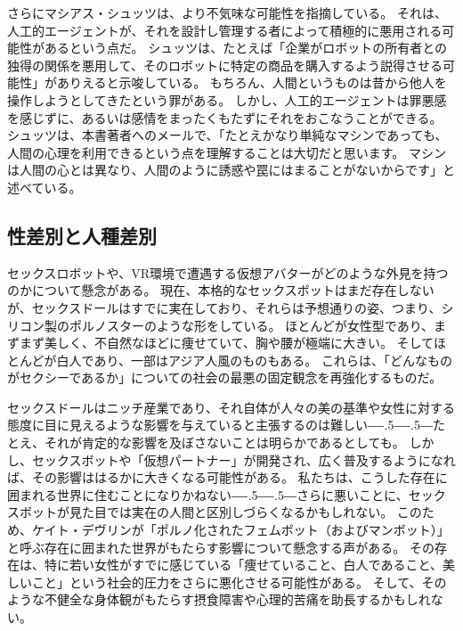 \documentclass[paper=a4,book,openany]{jlreq}
\def\DDASH{―\kern-.5\zw―\kern-.5\zw―} %
\begin{document}
さらにマシアス・シュッツは、より不気味な可能性を指摘している。
それは、人工的エージェントが、それを設計し管理する者によって積極的に悪用される可能性があるという点だ。
シュッツは、たとえば「企業がロボットの所有者との独得の関係を悪用して、そのロボットに特定の商品を購入するよう説得させる可能性」がありえると示唆している。
もちろん、人間というものは昔から他人を操作しようとしてきたという罪がある。
しかし、人工的エージェントは罪悪感を感じずに、あるいは感情をまったくもたずにそれをおこなうことができる。
シュッツは、本書著者へのメールで、「たとえかなり単純なマシンであっても、人間の心理を利用できるという点を理解することは大切だと思います。
マシンは人間の心とは異なり、人間のように誘惑や罠にはまることがないからです」と述べている。

\subsection{性差別と人種差別}

セックスロボットや、VR環境で遭遇する仮想アバターがどのような外見を持つのかについて懸念がある。
現在、本格的なセックスボットはまだ存在しないが、セックスドールはすでに実在しており、それらは予想通りの姿、つまり、シリコン製のポルノスターのような形をしている。
ほとんどが女性型であり、まずまず美しく、不自然なほどに痩せていて、胸や腰が極端に大きい。
そしてほとんどが白人であり、一部はアジア人風のものもある。
これらは、「どんなものがセクシーであるか」についての社会の最悪の固定観念を再強化するものだ。

セックスドールはニッチ産業であり、それ自体が人々の美の基準や女性に対する態度に目に見えるような影響を与えていると主張するのは難しい{\DDASH}たとえ、それが肯定的な影響を及ぼさないことは明らかであるとしても。
しかし、セックスボットや「仮想パートナー」が開発され、広く普及するようになれば、その影響ははるかに大きくなる可能性がある。
私たちは、こうした存在に囲まれる世界に住むことになりかねない{\DDASH}さらに悪いことに、セックスボットが見た目では実在の人間と区別しづらくなるかもしれない。
このため、ケイト・デヴリンが「ポルノ化されたフェムボット（およびマンボット）」と呼ぶ存在に囲まれた世界がもたらす影響について懸念する声がある\citep[cf.][]{devlin19:_turned}。
その存在は、特に若い女性がすでに感じている「痩せていること、白人であること、美しいこと」という社会的圧力をさらに悪化させる可能性がある。
そして、そのような不健全な身体観がもたらす摂食障害や心理的苦痛を助長するかもしれない。
\end{document}
